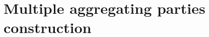 \chapter{Multiple aggregating parties construction}
\label{app:manyAggregatingParties}


\begin{comment}
Let $x=\sum_{j=0}^{l-1} x_j u^j$, where $x_j$ is an integer and $x_j\in[0,u)$, $u,l$ are integers and $j\in[0,l-1] (=\mathds{Z}_l)$. Then it holds that $x\in[0,u^l)$.
\begin{align*}
x =& \sum_{j=0}^{l-1} x_j u^j \leq \sum_{j=0}^{l-1}  (u-1)u^j = \sum_{j=0}^{l-1} u^{j+1} - \sum_{j=0}^{l-1} u^j = (u-1) \sum_{j=0}^{l-1} u^j =\\
 &(u-1) \frac{u^l-1}{u-1} = u^l-1< u^l 
\end{align*}
Hence the  statement is proved and it is trivial to see that if $j\in[0,l]$ the value of $x$ could exceed $u^l$.
\end{comment}
